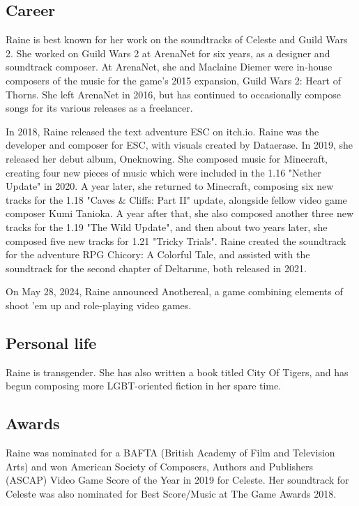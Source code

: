\subsection{Career}

Raine is best known for her work on the soundtracks of Celeste and Guild Wars 2.
She worked on Guild Wars 2 at ArenaNet for six years, as a designer and soundtrack composer.
At ArenaNet, she and Maclaine Diemer were in-house composers of the music for the game's 2015 expansion, Guild Wars 2: Heart of Thorns.
She left ArenaNet in 2016, but has continued to occasionally compose songs for its various releases as a freelancer.

In 2018, Raine released the text adventure ESC on itch.io.
Raine was the developer and composer for ESC, with visuals created by Dataerase.
In 2019, she released her debut album, Oneknowing.
She composed music for Minecraft, creating four new pieces of music which were included in the 1.16 "Nether Update" in 2020.
A year later, she returned to Minecraft, composing six new tracks for the 1.18 "Caves \&{} Cliffs: Part II" update, alongside fellow video game composer Kumi Tanioka.
A year after that, she also composed another three new tracks for the 1.19 "The Wild Update", and then about two years later, she composed five new tracks for 1.21 "Tricky Trials".
Raine created the soundtrack for the adventure RPG Chicory: A Colorful Tale, and assisted with the soundtrack for the second chapter of Deltarune, both released in 2021.

On May 28, 2024, Raine announced Anothereal, a game combining elements of shoot 'em up and role-playing video games.

\subsection{Personal life}

Raine is transgender.
She has also written a book titled City Of Tigers, and has begun composing more LGBT-oriented fiction in her spare time.

\subsection{Awards}

Raine was nominated for a BAFTA (British Academy of Film and Television Arts) and won American Society of Composers, Authors and Publishers (ASCAP) Video Game Score of the Year in 2019 for Celeste. Her soundtrack for Celeste was also nominated for Best Score/Music at The Game Awards 2018.
